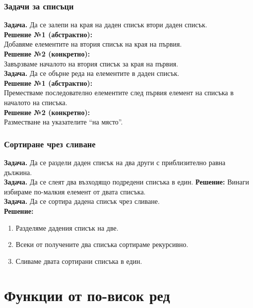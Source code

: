 \documentclass[alsotrans]{beamerswitch}
\begin{document}
\begin{frame}
  \frametitle{Задачи за списъци}

  \textbf{Задача.} Да се залепи на края на даден списък втори даден списък.\\[2ex]
  \pause
  \textbf{Решение №1 (абстрактно):} \\
  Добавяме елементите на втория списък на края на първия.\\[2ex]
  \pause
  \textbf{Решение №2 (конкретно):} \\
  Завързваме началото на втория списък за края на първия.\\[2ex]
  \pause\pause
  \textbf{Задача.} Да се обърне реда на елементите в даден списък.\\[2ex]
  \pause
  \textbf{Решение №1 (абстрактно):}\\
  Преместваме последователно елементите след първия елемент на списъка в началото на списъка.\\[2ex]
  \pause
  \textbf{Решение №2 (конкретно):}\\
  Разместване на указателите ``на място''.
\end{frame}

\begin{frame}
  \frametitle{Сортиране чрез сливане}

  \textbf{Задача.} Да се раздели даден списък на два други с приблизително равна дължина.\\[2ex]
  \pause
  \textbf{Задача.} Да се слеят два възходящо подредени списъка в един.
  \pause
  \textbf{Решение:} Винаги избираме по-малкия елемент от двата списъка.\\[2ex]
  \pause
  \textbf{Задача.} Да се сортира дадена списък чрез сливане.\\
  \pause
  \textbf{Решение:}
  \begin{enumerate}
  \item Разделяме дадения списък на две.
  \item Всеки от получените два списъка сортираме рекурсивно.
  \item Сливаме двата сортирани списъка в един.
  \end{enumerate}
\end{frame}

\section{Функции от по-висок ред}
\end{document}
